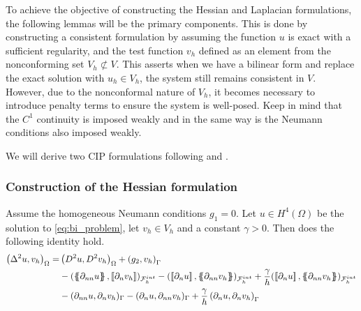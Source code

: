 To achieve the objective of constructing the Hessian and Laplacian formulations, the following lemmas will be the primary components. This is done by constructing a consistent formulation by assuming the function $u$ is exact with a sufficient
regularity, and the test function $v_{h}$ defined as an element from the nonconforming set $V_{h} \not\subset V$.
This asserts when we have a bilinear form and replace the exact solution with $u_{h} \in V_{h}$, the system still remains consistent in $V$. However, due to the nonconformal nature of $V_{h}$, it becomes necessary to introduce penalty terms to ensure the system is well-posed. Keep in mind that the $C^{1}$
continuity is imposed weakly and in the same way is the Neumann conditions also imposed weakly.

We will derive two CIP formulations following \cite{brenner2012} and \cite{feng2007fully}.

\subsubsection{Construction of the Hessian formulation}%
\label{ssub:construction_of_the_hessian_formulation}



\begin{lemma}
    \label{lemma:hessian}
    Assume the homogeneous Neumann conditions $g_1 = 0 $.
Let $u \in H^{4}( \Omega ) $ be the solution to \eqref{eq:bi_problem}, let $ v_{h} \in V_{h}$ and a constant $\gamma >0$. Then does the following identity hold.
\begin{equation}
\label{eq:bi_basic_dg_full}
\begin{split}
    \left( \Delta  ^{2} u, v_h \right) _{\Omega }  =&   \left( D^2u, D^2v_h \right)_{\Omega } +  \left(g_{2}, v_h  \right) _{ \Gamma  }\\
    &    -  ( \mean{ \partial _{nn} u }   , \jump{ \partial_{n} v_h } )_{\mathcal{F}_{h}^{int} } -  (  \jump{ \partial_{n} u
    },\mean{ \partial _{nn} v_h } )_{\mathcal{F}_{h}^{int} } + \frac{\gamma }{h} (  \jump{ \partial_{n} u
    },\mean{ \partial _{nn} v_h } )_{\mathcal{F}_{h}^{int} } \\
    & - ( \partial _{nn} u , \partial _{n} v_h)_{\Gamma  }- ( \partial _{n} u , \partial _{nn} v_h)_{\Gamma  } + \frac{\gamma }{h}  \left(  \partial _{n} u,  \partial _{n} v_{h}      \right)_{\Gamma }
\end{split}
\end{equation}
\end{lemma}

